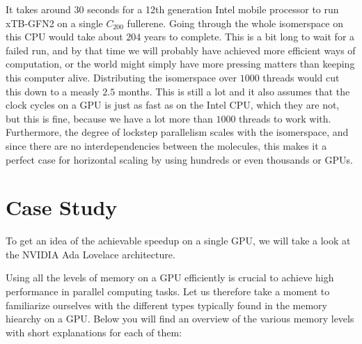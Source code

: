 It takes around $30$ seconds for a 12th generation Intel mobile processor to run xTB-GFN2 on a single $C_{200}$ fullerene. Going through the whole isomerspace on this CPU would take about $204$ years to complete. This is a bit long to wait for a failed run, and by that time we will probably have achieved more efficient ways of computation, or the world might simply have more pressing matters than keeping this computer alive. Distributing the isomerspace over $1000$ threads would cut this down to a measly $2.5$ months. This is still a lot and it also assumes that the clock cycles on a GPU is just as fast as on the Intel CPU, which they are not, but this is fine, because we have a lot more than $1000$ threads to work with. Furthermore, the degree of lockstep parallelism scales with the isomerspace, and since there are no interdependencies between the molecules, this makes it a perfect case for horizontal scaling by using hundreds or even thousands or GPUs.



\section{Case Study}

To get an idea of the achievable speedup on a single GPU, we will take a look at the NVIDIA Ada Lovelace architecture.

Using all the levels of memory on a GPU efficiently is crucial to achieve high performance in parallel computing tasks. Let us therefore take a moment to familiarize ourselves with the different types typically found in the memory hiearchy on a GPU. Below you will find an overview of the various memory levels with short explanations for each of them:

